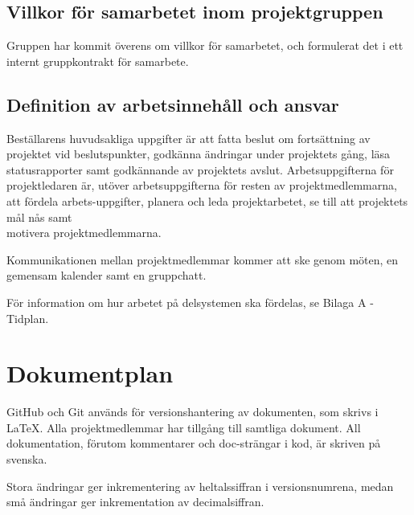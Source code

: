 \documentclass[a4paper,titlepage,12pt]{article}
\begin{document}
	\subsection{Villkor för samarbetet inom projektgruppen}
    Gruppen har kommit överens om villkor för samarbetet, och formulerat det i
    ett internt gruppkontrakt för samarbete.
	
	\subsection{Definition av arbetsinnehåll och ansvar}
	Beställarens huvudsakliga uppgifter är att fatta beslut
	om fortsättning av projektet vid beslutspunkter, godkänna
	ändringar under projektets gång, läsa statusrapporter samt godkännande av
	projektets avslut. Arbetsuppgifterna för projektledaren är, utöver
	arbetsuppgifterna för resten av projektmedlemmarna, att fördela
	arbets-uppgifter, planera och leda projektarbetet, se till att projektets mål
	nås samt \\ motivera projektmedlemmarna.

	Kommunikationen mellan projektmedlemmar kommer att ske genom möten, en
	gemensam kalender samt en gruppchatt.
	
	För information om hur arbetet på delsystemen ska fördelas, se Bilaga
	A - Tidplan.
	
	\section{Dokumentplan}
	GitHub och Git används för versionshantering av
	dokumenten, som skrivs i LaTeX. Alla projektmedlemmar har tillgång till
	samtliga dokument. All dokumentation, förutom kommentarer och doc-strängar
	i kod, är skriven på svenska.

	Stora ändringar ger inkrementering av heltalssiffran i versionsnumrena,
	medan små ändringar ger inkrementation av decimalsiffran.
	
\end{document}

